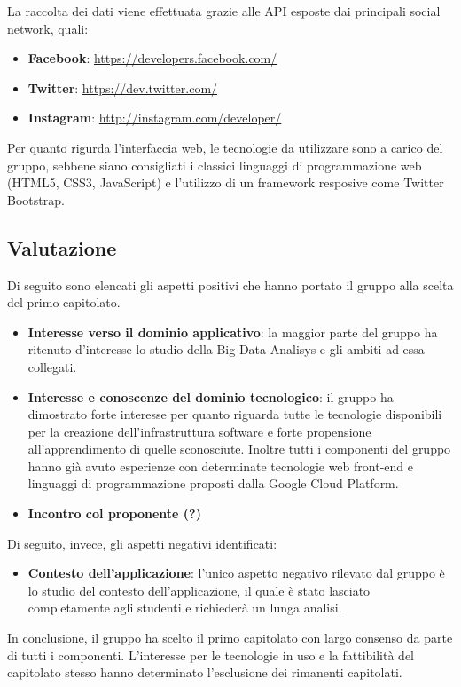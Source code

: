 La raccolta dei dati viene effettuata grazie alle API esposte dai principali social network, quali:
\begin{itemize}
\item \textbf{Facebook}: \url{https://developers.facebook.com/}
\item \textbf{Twitter}: \url{https://dev.twitter.com/}
\item \textbf{Instagram}: \url{http://instagram.com/developer/}
\end{itemize}
Per quanto rigurda l'interfaccia web, le tecnologie da utilizzare sono a carico del gruppo, sebbene siano consigliati i classici linguaggi di programmazione web (HTML5, CSS3, JavaScript) e l'utilizzo di un framework resposive come Twitter Bootstrap.
\subsection{Valutazione}
Di seguito sono elencati gli aspetti positivi che hanno portato il gruppo alla scelta del primo capitolato.
\begin{itemize}
\item \textbf{Interesse verso il dominio applicativo}: la maggior parte del gruppo ha ritenuto d'interesse lo studio della Big Data Analisys e gli ambiti ad essa collegati.
\item \textbf{Interesse e conoscenze del dominio tecnologico}: il gruppo ha dimostrato forte interesse per quanto riguarda tutte le tecnologie disponibili per la creazione dell'infrastruttura software e forte propensione all'apprendimento di quelle sconosciute. Inoltre tutti i componenti del gruppo hanno già avuto esperienze con determinate tecnologie web front-end e linguaggi di programmazione proposti dalla Google Cloud Platform.
\item \textbf{Incontro col proponente (?)}
\end{itemize}
Di seguito, invece, gli aspetti negativi identificati:
\begin{itemize}
\item \textbf{Contesto dell'applicazione}: l'unico aspetto negativo rilevato dal gruppo è lo studio del contesto dell'applicazione, il quale è stato lasciato completamente agli studenti e richiederà un lunga analisi.
\end{itemize}
In conclusione, il gruppo ha scelto il primo capitolato con largo consenso da parte di tutti i componenti. L'interesse per le tecnologie in uso e la fattibilità del capitolato stesso hanno determinato l'esclusione dei rimanenti capitolati.





